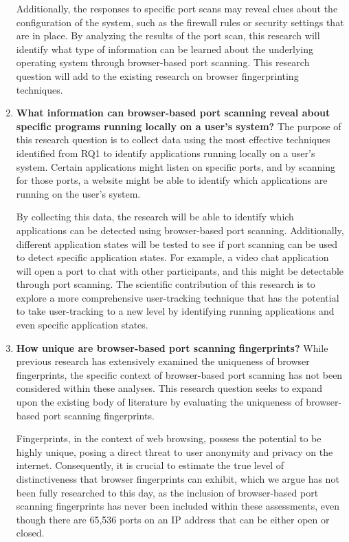 \begin{enumerate}[RQ1.]
Additionally, the responses to specific port scans may reveal clues about the configuration of the system, such as the firewall rules or security settings that are in place. By analyzing the results of the port scan, this research will identify what type of information can be learned about the underlying operating system through browser-based port scanning. This research question will add to the existing research on browser fingerprinting techniques.

\item \textbf{What information can browser-based port scanning reveal about specific programs running locally on a user's system?} The purpose of this research question is to collect data using the most effective techniques identified from RQ1 to identify applications running locally on a user's system. Certain applications might listen on specific ports, and by scanning for those ports, a website might be able to identify which applications are running on the user's system.

By collecting this data, the research will be able to identify which applications can be detected using browser-based port scanning. Additionally, different application states will be tested to see if port scanning can be used to detect specific application states. For example, a video chat application will open a port to chat with other participants, and this might be detectable through port scanning. The scientific contribution of this research is to explore a more comprehensive user-tracking technique that has the potential to take user-tracking to a new level by identifying running applications and even specific application states.

\item \textbf{How unique are browser-based port scanning fingerprints?}
While previous research has extensively examined the uniqueness of browser fingerprints, the specific context of browser-based port scanning has not been considered within these analyses. This research question seeks to expand upon the existing body of literature by evaluating the uniqueness of browser-based port scanning fingerprints.

Fingerprints, in the context of web browsing, possess the potential to be highly unique, posing a direct threat to user anonymity and privacy on the internet. Consequently, it is crucial to estimate the true level of distinctiveness that browser fingerprints can exhibit, which we argue has not been fully researched to this day, as the inclusion of browser-based port scanning fingerprints has never been included within these assessments, even though there are 65,536 ports on an IP address that can be either open or closed.
\end{enumerate}

